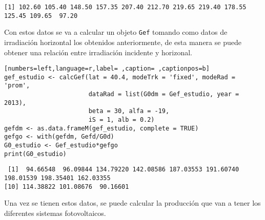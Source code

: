 \begin{verbatim}
[1] 102.60 105.40 148.50 157.35 207.40 212.70 219.65 219.40 178.55 125.45 109.65  97.20
\end{verbatim}


Con estos datos se va a calcular un objeto \texttt{Gef} tomando como datos de irradiación horizontal los obtenidos anteriormente, de esta manera se puede obtener una relación entre irradiación incidente y horizonal.
\begin{lstlisting}[numbers=left,language=r,label= ,caption= ,captionpos=b]
gef_estudio <- calcGef(lat = 40.4, modeTrk = 'fixed', modeRad = 'prom',
                       dataRad = list(G0dm = Gef_estudio, year = 2013),
                       beta = 30, alfa = -19,
                       iS = 1, alb = 0.2)
gefdm <- as.data.frameM(gef_estudio, complete = TRUE)
gefgo <- with(gefdm, Gefd/G0d)
G0_estudio <- Gef_estudio*gefgo
print(G0_estudio)
\end{lstlisting}

\begin{verbatim}
 [1]  94.66548  96.09844 134.79220 142.08586 187.03553 191.60740 198.01539 198.35401 162.03355
[10] 114.38822 101.08676  90.16601
\end{verbatim}


Una vez se tienen estos datos, se puede calcular la producción que van a tener los diferentes sistemas fotovoltaicos.

